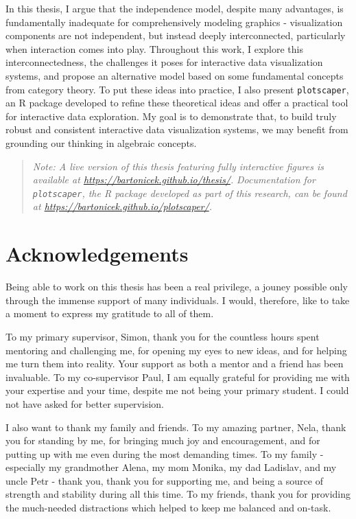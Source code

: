 \documentclass[
  openany]{book}
\theoremstyle{definition}
\theoremstyle{definition}
\theoremstyle{definition}
\theoremstyle{definition}
\theoremstyle{remark}
\begin{document}
In this thesis, I argue that the independence model, despite many advantages, is fundamentally inadequate for comprehensively modeling graphics - visualization components are not independent, but instead deeply interconnected, particularly when interaction comes into play. Throughout this work, I explore this interconnectedness, the challenges it poses for interactive data visualization systems, and propose an alternative model based on some fundamental concepts from category theory. To put these ideas into practice, I also present \texttt{plotscaper}, an R package developed to refine these theoretical ideas and offer a practical tool for interactive data exploration. My goal is to demonstrate that, to build truly robust and consistent interactive data visualization systems, we may benefit from grounding our thinking in algebraic concepts.

\begin{quote}
\emph{Note: A live version of this thesis featuring fully interactive figures is available at \url{https://bartonicek.github.io/thesis/}.}
\emph{Documentation for \texttt{plotscaper}, the R package developed as part of this research, can be found at \url{https://bartonicek.github.io/plotscaper/}.}
\end{quote}

\chapter{Acknowledgements}\label{acknowledgements}

Being able to work on this thesis has been a real privilege, a jouney possible only through the immense support of many individuals. I would, therefore, like to take a moment to express my gratitude to all of them.

To my primary supervisor, Simon, thank you for the countless hours spent mentoring and challenging me, for opening my eyes to new ideas, and for helping me turn them into reality. Your support as both a mentor and a friend has been invaluable. To my co-supervisor Paul, I am equally grateful for providing me with your expertise and your time, despite me not being your primary student. I could not have asked for better supervision.

I also want to thank my family and friends. To my amazing partner, Nela, thank you for standing by me, for bringing much joy and encouragement, and for putting up with me even during the most demanding times. To my family - especially my grandmother Alena, my mom Monika, my dad Ladislav, and my uncle Petr - thank you, thank you for supporting me, and being a source of strength and stability during all this time. To my friends, thank you for providing the much-needed distractions which helped to keep me balanced and on-task.
\end{document}
